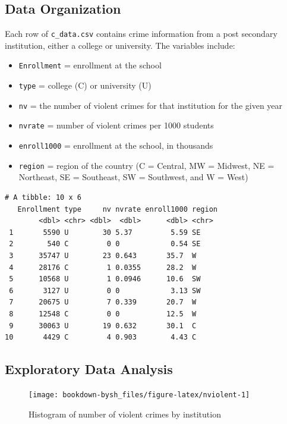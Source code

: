 \documentclass[
]{krantz}
\providecommand{\tightlist}{%
  \setlength{\itemsep}{0pt}\setlength{\parskip}{0pt}}
\begin{document}
\hypertarget{data-organization-1}{%
\subsection{Data Organization}\label{data-organization-1}}

Each row of \texttt{c\_data.csv} contains crime information from a post secondary institution, either a college or university. The variables include:

\begin{itemize}
\tightlist
\item
  \texttt{Enrollment} = enrollment at the school
\item
  \texttt{type} = college (C) or university (U)
\item
  \texttt{nv} = the number of violent crimes for that institution for the given year
\item
  \texttt{nvrate} = number of violent crimes per 1000 students
\item
  \texttt{enroll1000} = enrollment at the school, in thousands
\item
  \texttt{region} = region of the country (C = Central, MW = Midwest, NE = Northeast, SE = Southeast, SW = Southwest, and W = West)
\end{itemize}

\begin{verbatim}
# A tibble: 10 x 6
   Enrollment type     nv nvrate enroll1000 region
        <dbl> <chr> <dbl>  <dbl>      <dbl> <chr> 
 1       5590 U        30 5.37         5.59 SE    
 2        540 C         0 0            0.54 SE    
 3      35747 U        23 0.643       35.7  W     
 4      28176 C         1 0.0355      28.2  W     
 5      10568 U         1 0.0946      10.6  SW    
 6       3127 U         0 0            3.13 SW    
 7      20675 U         7 0.339       20.7  W     
 8      12548 C         0 0           12.5  W     
 9      30063 U        19 0.632       30.1  C     
10       4429 C         4 0.903        4.43 C     
\end{verbatim}

\hypertarget{exploratory-data-analysis}{%
\subsection{Exploratory Data Analysis}\label{exploratory-data-analysis}}

\begin{figure}

{\centering \texttt{[image: bookdown-bysh\_files/figure-latex/nviolent-1]} 

}

\caption{Histogram of number of violent crimes by institution}\label{fig:nviolent}
\end{figure}
\end{document}

